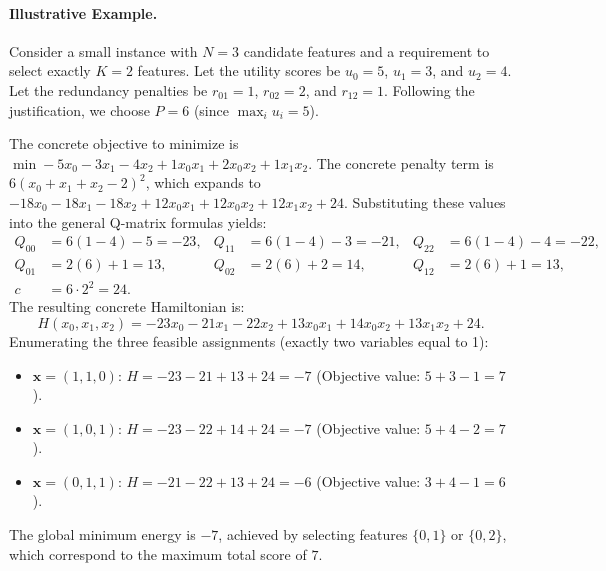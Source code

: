 \documentclass[12pt]{article}
\begin{document}
\paragraph{Illustrative Example.}
Consider a small instance with $N=3$ candidate features and a requirement to select exactly $K=2$ features. Let the utility scores be $u_0 = 5$, $u_1 = 3$, and $u_2 = 4$. Let the redundancy penalties be $r_{01} = 1$, $r_{02} = 2$, and $r_{12} = 1$. Following the justification, we choose $P = 6$ (since $\max_i u_i = 5$). 

The concrete objective to minimize is $\min -5x_0 - 3x_1 - 4x_2 + 1x_0x_1 + 2x_0x_2 + 1x_1x_2$. The concrete penalty term is $6(x_0 + x_1 + x_2 - 2)^2$, which expands to $-18x_0 - 18x_1 - 18x_2 + 12x_0x_1 + 12x_0x_2 + 12x_1x_2 + 24$. Substituting these values into the general Q-matrix formulas yields:
\begin{align}
Q_{00} &= 6(1 - 4) - 5 = -23, & Q_{11} &= 6(1 - 4) - 3 = -21, & Q_{22} &= 6(1 - 4) - 4 = -22, \\
Q_{01} &= 2(6) + 1 = 13, & Q_{02} &= 2(6) + 2 = 14, & Q_{12} &= 2(6) + 1 = 13, \\
c &= 6 \cdot 2^2 = 24.
\end{align}
The resulting concrete Hamiltonian is:
\[
H(x_0, x_1, x_2) = -23x_0 - 21x_1 - 22x_2 + 13x_0x_1 + 14x_0x_2 + 13x_1x_2 + 24.
\]
Enumerating the three feasible assignments (exactly two variables equal to 1):
\begin{itemize}
\item $\mathbf{x} = (1, 1, 0)$: $H = -23 - 21 + 13 + 24 = -7$ (Objective value: $5 + 3 - 1 = 7$).
\item $\mathbf{x} = (1, 0, 1)$: $H = -23 - 22 + 14 + 24 = -7$ (Objective value: $5 + 4 - 2 = 7$).
\item $\mathbf{x} = (0, 1, 1)$: $H = -21 - 22 + 13 + 24 = -6$ (Objective value: $3 + 4 - 1 = 6$).
\end{itemize}
The global minimum energy is $-7$, achieved by selecting features $\{0, 1\}$ or $\{0, 2\}$, which correspond to the maximum total score of $7$.
\end{document}
